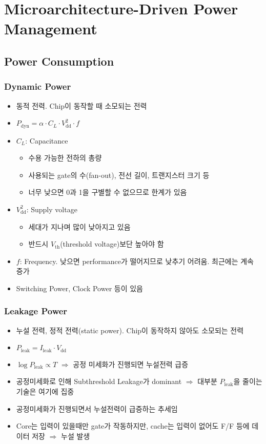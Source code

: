 \section{Microarchitecture-Driven Power Management}

\subsection{Power Consumption}

\subsubsection*{Dynamic Power}
\begin{itemize}
    \item 동적 전력. Chip이 동작할 때 소모되는 전력
    \item $P_{\mathrm{dyn}} = \alpha \cdot C_L \cdot V_{\mathrm{dd}}^2 \cdot f$
    \item $C_L$: Capacitance
    \begin{itemize}
        \item 수용 가능한 전하의 총량
        \item 사용되는 gate의 수(fan-out), 전선 길이, 트랜지스터 크기 등
        \item 너무 낮으면 0과 1을 구별할 수 없으므로 한계가 있음
    \end{itemize}
    \item $V_{\mathrm{dd}}^2$: Supply voltage
    \begin{itemize}
        \item 세대가 지나며 많이 낮아지고 있음
        \item 반드시 $V_{\mathrm{th}}$(threshold voltage)보단 높아야 함
    \end{itemize}    
    \item $f$: Frequency. 낮으면 performance가 떨어지므로 낮추기 어려움. 최근에는 계속 증가
    \item Switching Power, Clock Power 등이 있음
\end{itemize}

\subsubsection*{Leakage Power}
\begin{itemize}
    \item 누설 전력, 정적 전력(static power). Chip이 동작하지 않아도 소모되는 전력
    \item $P_{\mathrm{leak}} = I_{\mathrm{leak}} \cdot V_{\mathrm{dd}}$
    \item $\log P_{\mathrm{leak}} \varpropto T$ $\Rightarrow$ 공정 미세화가 진행되면 누설전력 급증
    \item 공정미세화로 인해 Subthreshold Leakage가 dominant $\Rightarrow$ 대부분 $P_{\mathrm{leak}}$을 줄이는 기술은 여기에 집중
    \item 공정미세화가 진행되면서 누설전력이 급증하는 추세임
    \item Core는 입력이 있을때만 gate가 작동하지만, cache는 입력이 없어도 F/F 등에 데이터 저장 $\Rightarrow$ 누설 발생
\end{itemize}
\pagebreak

